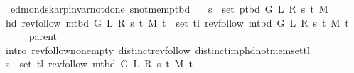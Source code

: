 \begin{isabellebody}
\isanewline
%
\endisadelimproof
%
\isadeliminvisible
\isanewline
%
\endisadeliminvisible
%
\isataginvisible
{}\isamarkupfalse%
\ {\isacharparenleft}{\kern0pt}\ edmonds{\isacharunderscore}{\kern0pt}karp{\isacharunderscore}{\kern0pt}invar{\isacharunderscore}{\kern0pt}not{\isacharunderscore}{\kern0pt}done{\isacharunderscore}{\kern0pt}{}{\isacharparenright}{\kern0pt}\ s{\isacharunderscore}{\kern0pt}not{\isacharunderscore}{\kern0pt}mem{\isacharunderscore}{\kern0pt}p{\isacharunderscore}{\kern0pt}tbd{\isacharcolon}{\kern0pt}\isanewline
\ \ \ {\isachardoublequoteopen}s\ {\isasymnotin}\ set\ {\isacharparenleft}{\kern0pt}p{\isacharunderscore}{\kern0pt}tbd\ G\ L\ R\ s\ t\ M{\isacharparenright}{\kern0pt}{\isachardoublequoteclose}%
\endisataginvisible
{\isafoldinvisible}%
%
\isadeliminvisible
\isanewline
%
\endisadeliminvisible
%
\isadelimproof
%
\endisadelimproof
%
\isatagproof
{}\isamarkupfalse%
\ {\isacharminus}{\kern0pt}\isanewline
\ \ \isamarkupfalse%
\ {\isachardoublequoteopen}hd\ {\isacharparenleft}{\kern0pt}rev{\isacharunderscore}{\kern0pt}follow\ {\isacharparenleft}{\kern0pt}m{\isacharunderscore}{\kern0pt}tbd\ G\ L\ R\ s\ t\ M{\isacharparenright}{\kern0pt}\ t{\isacharparenright}{\kern0pt}\ {\isasymnotin}\ set\ {\isacharparenleft}{\kern0pt}tl\ {\isacharparenleft}{\kern0pt}rev{\isacharunderscore}{\kern0pt}follow\ {\isacharparenleft}{\kern0pt}m{\isacharunderscore}{\kern0pt}tbd\ G\ L\ R\ s\ t\ M{\isacharparenright}{\kern0pt}\ t{\isacharparenright}{\kern0pt}{\isacharparenright}{\kern0pt}{\isachardoublequoteclose}\isanewline
\ \ \ \ \isamarkupfalse%
\ parent\isanewline
\ \ \ \ \isamarkupfalse%
\ {\isacharparenleft}{\kern0pt}intro\ rev{\isacharunderscore}{\kern0pt}follow{\isacharunderscore}{\kern0pt}non{\isacharunderscore}{\kern0pt}empty\ distinct{\isacharunderscore}{\kern0pt}rev{\isacharunderscore}{\kern0pt}follow\ distinct{\isacharunderscore}{\kern0pt}imp{\isacharunderscore}{\kern0pt}hd{\isacharunderscore}{\kern0pt}not{\isacharunderscore}{\kern0pt}mem{\isacharunderscore}{\kern0pt}set{\isacharunderscore}{\kern0pt}tl{\isacharparenright}{\kern0pt}\isanewline
\ \ \isamarkupfalse%
\ {\isachardoublequoteopen}s\ {\isasymnotin}\ set\ {\isacharparenleft}{\kern0pt}tl\ {\isacharparenleft}{\kern0pt}rev{\isacharunderscore}{\kern0pt}follow\ {\isacharparenleft}{\kern0pt}m{\isacharunderscore}{\kern0pt}tbd\ G\ L\ R\ s\ t\ M{\isacharparenright}{\kern0pt}\ t{\isacharparenright}{\kern0pt}{\isacharparenright}{\kern0pt}{\isachardoublequoteclose}\isanewline

\end{isabellebody}
